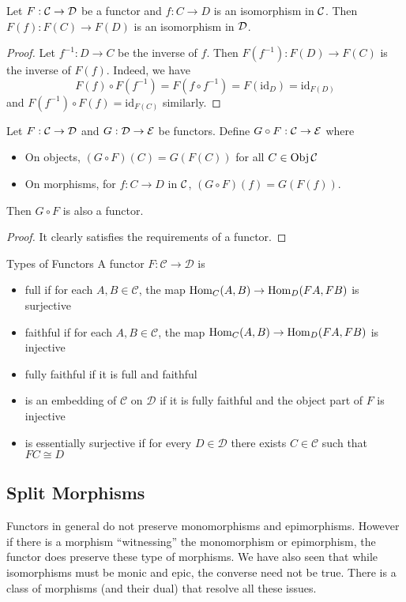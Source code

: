 \documentclass[a4paper]{article}
\begin{document}
\begin{lmm}{}{} Let $F:\mathcal{C}\to\mathcal{D}$ be a functor and $f:C\to D$ is an isomorphism in $\mathcal{C}$. Then $F(f):F(C)\to F(D)$ is an isomorphism in $\mathcal{D}$. \tcbline
\begin{proof}
Let $f^{-1}:D\to C$ be the inverse of $f$. Then $F(f^{-1}):F(D)\to F(C)$ is the inverse of $F(f)$. Indeed, we have $$F(f)\circ F(f^{-1})=F(f\circ f^{-1})=F(\text{id}_D)=\text{id}_{F(D)}$$ and $F(f^{-1})\circ F(f)=\text{id}_{F(C)}$ similarly. 
\end{proof}
\end{lmm}

\begin{prp}{}{} Let $F:\mathcal{C}\to\mathcal{D}$ and $G:\mathcal{D}\to\mathcal{E}$ be functors. Define $G\circ F:\mathcal{C}\to\mathcal{E}$ where
\begin{itemize}
\item On objects, $(G\circ F)(C)=G(F(C))$ for all $C\in\operatorname{Obj}\mathcal{C}$
\item On morphisms, for $f:C\to D$ in $\mathcal{C}$, $(G\circ F)(f)=G(F(f))$. 
\end{itemize} 
Then $G\circ F$ is also a functor. \tcbline
\begin{proof}
It clearly satisfies the requirements of a functor. 
\end{proof}
\end{prp}

\begin{defn}{Types of Functors}{} A functor $F:\mathcal{C}\to\mathcal{D}$ is 
\begin{itemize}
\item full if for each $A,B\in\mathcal{C}$, the map $\operatorname{Hom}_C(A,B)\to\operatorname{Hom}_D(FA,FB)$ is surjective
\item faithful if for each $A,B\in\mathcal{C}$, the map $\operatorname{Hom}_C(A,B)\to\operatorname{Hom}_D(FA,FB)$ is injective
\item fully faithful if it is full and faithful
\item is an embedding of $\mathcal{C}$ on $\mathcal{D}$ if it is fully faithful and the object part of $F$ is injective
\item is essentially surjective if for every $D\in\mathcal{D}$ there exists $C\in\mathcal{C}$ such that $FC\cong D$
\end{itemize}
\end{defn}

\subsection{Split Morphisms}
Functors in general do not preserve monomorphisms and epimorphisms. However if there is a morphism ``witnessing'' the monomorphism or epimorphism, the functor does preserve these type of morphisms. We have also seen that while isomorphisms must be monic and epic, the converse need not be true. There is a class of morphisms (and their dual) that resolve all these issues. 
\end{document}
